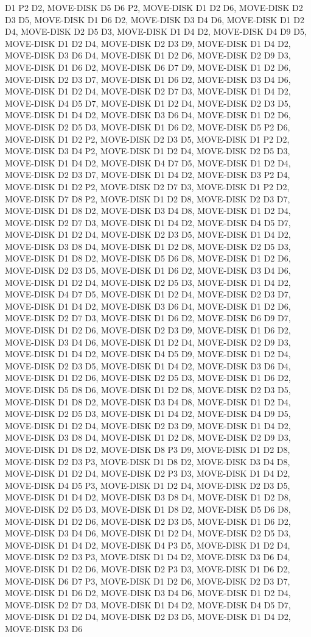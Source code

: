 \documentclass[12pt]{article}
\begin{document}
\begin{appendix}
\begin{itemize}
D1 P2 D2,  MOVE-DISK D5 D6 P2,  MOVE-DISK D1 D2 D6,  MOVE-DISK D2 D3 D5,  MOVE-DISK D1 D6 D2,  MOVE-DISK D3 D4 D6,  MOVE-DISK D1 D2 D4,  MOVE-DISK D2 D5 D3,  MOVE-DISK D1 D4 D2,  MOVE-DISK D4 D9 D5,  MOVE-DISK D1 D2 D4,  MOVE-DISK D2 D3 D9,  MOVE-DISK D1 D4 D2,  MOVE-DISK D3 D6 D4,  MOVE-DISK D1 D2 D6,  MOVE-DISK D2 D9 D3,  MOVE-DISK D1 D6 D2,  MOVE-DISK D6 D7 D9,  MOVE-DISK D1 D2 D6,  MOVE-DISK D2 D3 D7,  MOVE-DISK D1 D6 D2,  MOVE-DISK D3 D4 D6,  MOVE-DISK D1 D2 D4,  MOVE-DISK D2 D7 D3,  MOVE-DISK D1 D4 D2,  MOVE-DISK D4 D5 D7,  MOVE-DISK D1 D2 D4,  MOVE-DISK D2 D3 D5,  MOVE-DISK D1 D4 D2,  MOVE-DISK D3 D6 D4,  MOVE-DISK D1 D2 D6,  MOVE-DISK D2 D5 D3,  MOVE-DISK D1 D6 D2,  MOVE-DISK D5 P2 D6,  MOVE-DISK D1 D2 P2,  MOVE-DISK D2 D3 D5,  MOVE-DISK D1 P2 D2,  MOVE-DISK D3 D4 P2,  MOVE-DISK D1 D2 D4,  MOVE-DISK D2 D5 D3,  MOVE-DISK D1 D4 D2,  MOVE-DISK D4 D7 D5,  MOVE-DISK D1 D2 D4,  MOVE-DISK D2 D3 D7,  MOVE-DISK D1 D4 D2,  MOVE-DISK D3 P2 D4,  MOVE-DISK D1 D2 P2,  MOVE-DISK D2 D7 D3,  MOVE-DISK D1 P2 D2,  MOVE-DISK D7 D8 P2,  MOVE-DISK D1 D2 D8,  MOVE-DISK D2 D3 D7,  MOVE-DISK D1 D8 D2,  MOVE-DISK D3 D4 D8,  MOVE-DISK D1 D2 D4,  MOVE-DISK D2 D7 D3,  MOVE-DISK D1 D4 D2,  MOVE-DISK D4 D5 D7,  MOVE-DISK D1 D2 D4,  MOVE-DISK D2 D3 D5,  MOVE-DISK D1 D4 D2,  MOVE-DISK D3 D8 D4,  MOVE-DISK D1 D2 D8,  MOVE-DISK D2 D5 D3,  MOVE-DISK D1 D8 D2,  MOVE-DISK D5 D6 D8,  MOVE-DISK D1 D2 D6,  MOVE-DISK D2 D3 D5,  MOVE-DISK D1 D6 D2,  MOVE-DISK D3 D4 D6,  MOVE-DISK D1 D2 D4,  MOVE-DISK D2 D5 D3,  MOVE-DISK D1 D4 D2,  MOVE-DISK D4 D7 D5,  MOVE-DISK D1 D2 D4,  MOVE-DISK D2 D3 D7,  MOVE-DISK D1 D4 D2,  MOVE-DISK D3 D6 D4,  MOVE-DISK D1 D2 D6,  MOVE-DISK D2 D7 D3,  MOVE-DISK D1 D6 D2,  MOVE-DISK D6 D9 D7,  MOVE-DISK D1 D2 D6,  MOVE-DISK D2 D3 D9,  MOVE-DISK D1 D6 D2,  MOVE-DISK D3 D4 D6,  MOVE-DISK D1 D2 D4,  MOVE-DISK D2 D9 D3,  MOVE-DISK D1 D4 D2,  MOVE-DISK D4 D5 D9,  MOVE-DISK D1 D2 D4,  MOVE-DISK D2 D3 D5,  MOVE-DISK D1 D4 D2,  MOVE-DISK D3 D6 D4,  MOVE-DISK D1 D2 D6,  MOVE-DISK D2 D5 D3,  MOVE-DISK D1 D6 D2,  MOVE-DISK D5 D8 D6,  MOVE-DISK D1 D2 D8,  MOVE-DISK D2 D3 D5,  MOVE-DISK D1 D8 D2,  MOVE-DISK D3 D4 D8,  MOVE-DISK D1 D2 D4,  MOVE-DISK D2 D5 D3,  MOVE-DISK D1 D4 D2,  MOVE-DISK D4 D9 D5,  MOVE-DISK D1 D2 D4,  MOVE-DISK D2 D3 D9,  MOVE-DISK D1 D4 D2,  MOVE-DISK D3 D8 D4,  MOVE-DISK D1 D2 D8,  MOVE-DISK D2 D9 D3,  MOVE-DISK D1 D8 D2,  MOVE-DISK D8 P3 D9,  MOVE-DISK D1 D2 D8,  MOVE-DISK D2 D3 P3,  MOVE-DISK D1 D8 D2,  MOVE-DISK D3 D4 D8,  MOVE-DISK D1 D2 D4,  MOVE-DISK D2 P3 D3,  MOVE-DISK D1 D4 D2,  MOVE-DISK D4 D5 P3,  MOVE-DISK D1 D2 D4,  MOVE-DISK D2 D3 D5,  MOVE-DISK D1 D4 D2,  MOVE-DISK D3 D8 D4,  MOVE-DISK D1 D2 D8,  MOVE-DISK D2 D5 D3,  MOVE-DISK D1 D8 D2,  MOVE-DISK D5 D6 D8,  MOVE-DISK D1 D2 D6,  MOVE-DISK D2 D3 D5,  MOVE-DISK D1 D6 D2,  MOVE-DISK D3 D4 D6,  MOVE-DISK D1 D2 D4,  MOVE-DISK D2 D5 D3,  MOVE-DISK D1 D4 D2,  MOVE-DISK D4 P3 D5,  MOVE-DISK D1 D2 D4,  MOVE-DISK D2 D3 P3,  MOVE-DISK D1 D4 D2,  MOVE-DISK D3 D6 D4,  MOVE-DISK D1 D2 D6,  MOVE-DISK D2 P3 D3,  MOVE-DISK D1 D6 D2,  MOVE-DISK D6 D7 P3,  MOVE-DISK D1 D2 D6,  MOVE-DISK D2 D3 D7,  MOVE-DISK D1 D6 D2,  MOVE-DISK D3 D4 D6,  MOVE-DISK D1 D2 D4,  MOVE-DISK D2 D7 D3,  MOVE-DISK D1 D4 D2,  MOVE-DISK D4 D5 D7,  MOVE-DISK D1 D2 D4,  MOVE-DISK D2 D3 D5,  MOVE-DISK D1 D4 D2,  MOVE-DISK D3 D6 
\end{itemize}
\end{appendix}
\end{document}
